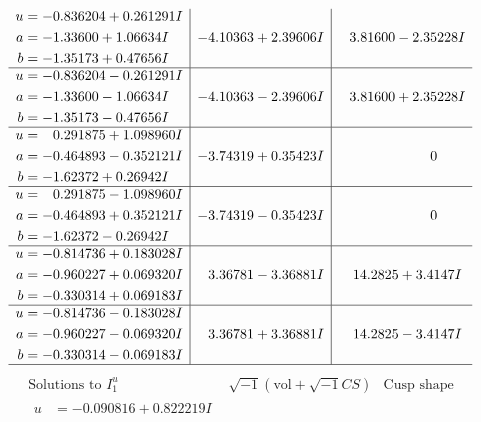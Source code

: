 \documentclass[1p]{elsarticle_modified}
\theoremstyle{definition}
\newcommand{\I}{\sqrt{-1}}
\begin{document}
$$\begin{array}{c|c|c}
\begin{aligned}
u &= -0.836204 + 0.261291 I \\
a &= -1.33600 + 1.06634 I \\
b &= -1.35173 + 0.47656 I\end{aligned}
 & -4.10363 + 2.39606 I & \phantom{-}3.81600 - 2.35228 I \\ \hline\begin{aligned}
u &= -0.836204 - 0.261291 I \\
a &= -1.33600 - 1.06634 I \\
b &= -1.35173 - 0.47656 I\end{aligned}
 & -4.10363 - 2.39606 I & \phantom{-}3.81600 + 2.35228 I \\ \hline\begin{aligned}
u &= \phantom{-}0.291875 + 1.098960 I \\
a &= -0.464893 - 0.352121 I \\
b &= -1.62372 + 0.26942 I\end{aligned}
 & -3.74319 + 0.35423 I & \phantom{-0.000000 } 0 \\ \hline\begin{aligned}
u &= \phantom{-}0.291875 - 1.098960 I \\
a &= -0.464893 + 0.352121 I \\
b &= -1.62372 - 0.26942 I\end{aligned}
 & -3.74319 - 0.35423 I & \phantom{-0.000000 } 0 \\ \hline\begin{aligned}
u &= -0.814736 + 0.183028 I \\
a &= -0.960227 + 0.069320 I \\
b &= -0.330314 + 0.069183 I\end{aligned}
 & \phantom{-}3.36781 - 3.36881 I & \phantom{-}14.2825 + 3.4147 I \\ \hline\begin{aligned}
u &= -0.814736 - 0.183028 I \\
a &= -0.960227 - 0.069320 I \\
b &= -0.330314 - 0.069183 I\end{aligned}
 & \phantom{-}3.36781 + 3.36881 I & \phantom{-}14.2825 - 3.4147 I\\
 \hline 
 \end{array}$$\newpage$$\begin{array}{c|c|c}  
\text{Solutions to }I^u_{1}& \I (\text{vol} + \sqrt{-1}CS) & \text{Cusp shape}\\
 \hline 
\begin{aligned}
u &= -0.090816 + 0.822219 I \\

\end{aligned}
\end{array}$$
\end{document}

